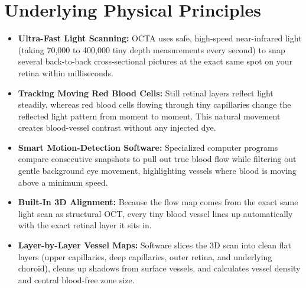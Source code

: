 \section{Underlying Physical Principles}
\begin{itemize}
\item \textbf{Ultra-Fast Light Scanning:} OCTA uses safe, high-speed near-infrared light (taking 70,000 to 400,000 tiny depth measurements every second) to snap several back-to-back cross-sectional pictures at the exact same spot on your retina within milliseconds.
\item \textbf{Tracking Moving Red Blood Cells:} Still retinal layers reflect light steadily, whereas red blood cells flowing through tiny capillaries change the reflected light pattern from moment to moment. This natural movement creates blood-vessel contrast without any injected dye.
\item \textbf{Smart Motion-Detection Software:} Specialized computer programs compare consecutive snapshots to pull out true blood flow while filtering out gentle background eye movement, highlighting vessels where blood is moving above a minimum speed.
\item \textbf{Built-In 3D Alignment:} Because the flow map comes from the exact same light scan as structural OCT, every tiny blood vessel lines up automatically with the exact retinal layer it sits in.
\item \textbf{Layer-by-Layer Vessel Maps:} Software slices the 3D scan into clean flat layers (upper capillaries, deep capillaries, outer retina, and underlying choroid), cleans up shadows from surface vessels, and calculates vessel density and central blood-free zone size.
\end{itemize}

